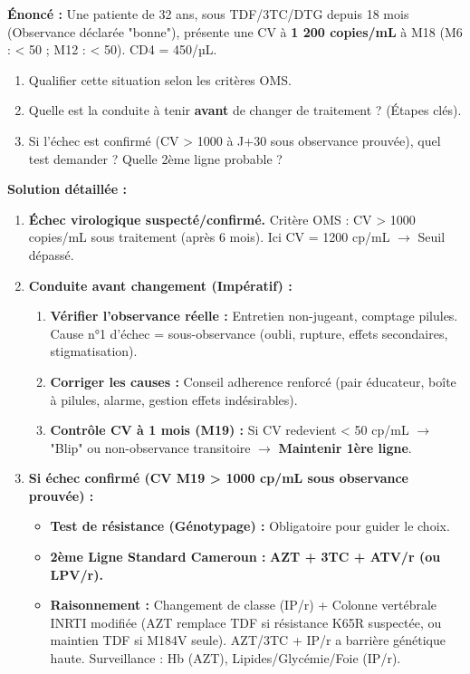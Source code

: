 \documentclass[11pt]{article}
\begin{document}
\begin{exoresolu}
\textbf{Énoncé :} Une patiente de 32 ans, sous TDF/3TC/DTG depuis 18 mois (Observance déclarée "bonne"), présente une CV à \textbf{1 200 copies/mL} à M18 (M6 : < 50 ; M12 : < 50). CD4 = 450/µL.
\begin{enumerate}
    \item Qualifier cette situation selon les critères OMS.
    \item Quelle est la conduite à tenir \textbf{avant} de changer de traitement ? (Étapes clés).
    \item Si l'échec est confirmé (CV > 1000 à J+30 sous observance prouvée), quel test demander ? Quelle 2ème ligne probable ?
\end{enumerate}
\tcblower
\textbf{Solution détaillée :}
\begin{enumerate}
    \item \textbf{Échec virologique suspecté/confirmé.} Critère OMS : CV > 1000 copies/mL sous traitement (après 6 mois). Ici CV = 1200 cp/mL $\rightarrow$ Seuil dépassé.
    \item \textbf{Conduite avant changement (Impératif) :}
        \begin{enumerate}
            \item \textbf{Vérifier l'observance réelle :} Entretien non-jugeant, comptage pilules. Cause n°1 d'échec = sous-observance (oubli, rupture, effets secondaires, stigmatisation).
            \item \textbf{Corriger les causes :} Conseil adherence renforcé (pair éducateur, boîte à pilules, alarme, gestion effets indésirables).
            \item \textbf{Contrôle CV à 1 mois (M19) :} Si CV redevient < 50 cp/mL $\rightarrow$ "Blip" ou non-observance transitoire $\rightarrow$ \textbf{Maintenir 1ère ligne}.
        \end{enumerate}
    \item \textbf{Si échec confirmé (CV M19 > 1000 cp/mL sous observance prouvée) :}
        \begin{itemize}
            \item \textbf{Test de résistance (Génotypage) :} Obligatoire pour guider le choix.
            \item \textbf{2ème Ligne Standard Cameroun :} \textbf{AZT + 3TC + ATV/r (ou LPV/r).}
            \item \textbf{Raisonnement :} Changement de classe (IP/r) + Colonne vertébrale INRTI modifiée (AZT remplace TDF si résistance K65R suspectée, ou maintien TDF si M184V seule). AZT/3TC + IP/r a barrière génétique haute. Surveillance : Hb (AZT), Lipides/Glycémie/Foie (IP/r).
        \end{itemize}
\end{enumerate}
\end{exoresolu}
\end{document}
